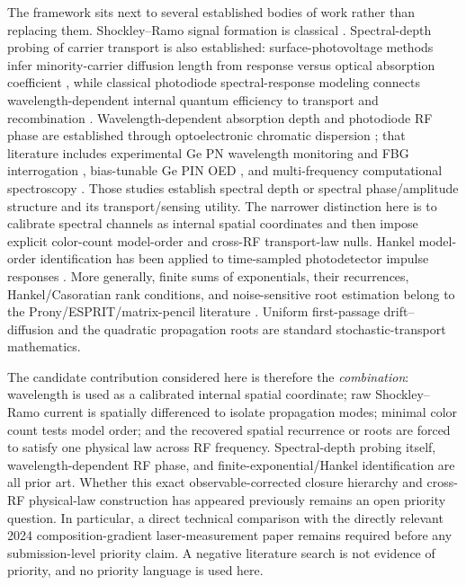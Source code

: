 \documentclass[11pt]{article}
\begin{document}
The framework sits next to several established bodies of work rather than replacing them. Shockley--Ramo signal formation is classical \cite{Shockley1938,Ramo1939,Dabrowski1989}. Spectral-depth probing of carrier transport is also established: surface-photovoltage methods infer minority-carrier diffusion length from response versus optical absorption coefficient \cite{Goodman1961}, while classical photodiode spectral-response modeling connects wavelength-dependent internal quantum efficiency to transport and recombination \cite{Geist1980}. Wavelength-dependent absorption depth and photodiode RF phase are established through optoelectronic chromatic dispersion \cite{Glasser2021}; that literature includes experimental Ge PN wavelength monitoring and FBG interrogation \cite{Liokumovitch2021}, bias-tunable Ge PIN OED \cite{Dutta2024}, and multi-frequency computational spectroscopy \cite{Kassa2026}. Those studies establish spectral depth or spectral phase/amplitude structure and its transport/sensing utility. The narrower distinction here is to calibrate spectral channels as internal spatial coordinates and then impose explicit color-count model-order and cross-RF transport-law nulls. Hankel model-order identification has been applied to time-sampled photodetector impulse responses \cite{Sun2025}. More generally, finite sums of exponentials, their recurrences, Hankel/Casoratian rank conditions, and noise-sensitive root estimation belong to the Prony/ESPRIT/matrix-pencil literature \cite{Prony1795,RoyKailath1989,HuaSarkar1990}. Uniform first-passage drift--diffusion and the quadratic propagation roots are standard stochastic-transport mathematics.

The candidate contribution considered here is therefore the \emph{combination}: wavelength is used as a calibrated internal spatial coordinate; raw Shockley--Ramo current is spatially differenced to isolate propagation modes; minimal color count tests model order; and the recovered spatial recurrence or roots are forced to satisfy one physical law across RF frequency. Spectral-depth probing itself, wavelength-dependent RF phase, and finite-exponential/Hankel identification are all prior art. Whether this exact observable-corrected closure hierarchy and cross-RF physical-law construction has appeared previously remains an open priority question. In particular, a direct technical comparison with the directly relevant 2024 composition-gradient laser-measurement paper \cite{Xu2024Laser} remains required before any submission-level priority claim. A negative literature search is not evidence of priority, and no priority language is used here.
\end{document}

